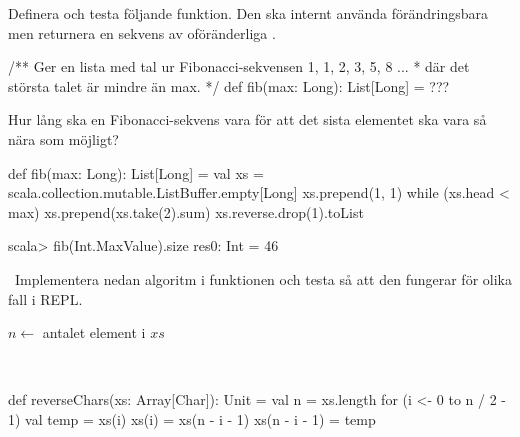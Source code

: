 \Subtask Definera och testa följande funktion. Den ska internt använda förändringsbara  men returnera en sekvens av oföränderliga .

\begin{Code}
/** Ger en lista med tal ur Fibonacci-sekvensen 1, 1, 2, 3, 5, 8 ...
  * där det största talet är mindre än max. */
def fib(max: Long): List[Long]  = ???
\end{Code}


\Subtask
Hur lång ska en Fibonacci-sekvens vara för att det sista elementet ska vara så nära  som möjligt?

\SOLUTION


\TaskSolved \what


\SubtaskSolved

\begin{Code}
def fib(max: Long): List[Long] = {
  val xs = scala.collection.mutable.ListBuffer.empty[Long]
  xs.prepend(1, 1)
  while (xs.head < max) xs.prepend(xs.take(2).sum)
  xs.reverse.drop(1).toList
}

\end{Code}

\SubtaskSolved

\begin{REPL}
scala> fib(Int.MaxValue).size
res0: Int = 46
\end{REPL}

\QUESTEND




\QUESTBEGIN

\Task \what~Implementera nedan algoritm i funktionen  och testa så att den fungerar för olika fall i REPL.


\begin{algorithm}[H]

 $n \leftarrow$ antalet element i $xs$\\
\end{algorithm}

\SOLUTION

\TaskSolved \what~
\begin{Code}
def reverseChars(xs: Array[Char]): Unit = {
  val n = xs.length
  for (i <- 0 to n / 2 - 1) {
    val temp = xs(i)
    xs(i) = xs(n - i - 1)
    xs(n - i - 1) = temp
  }
}
\end{Code}

